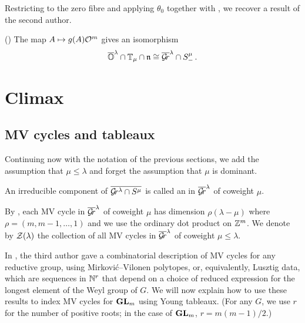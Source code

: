 \documentclass{article}
\begin{document}
Restricting to the zero fibre and applying $\theta_0$ together with , we recover a result of the second author. 
\begin{corollary}\label{cor:mvy} (\cite[Corollary~5.2.2]{dthesis})
    The map $ A \mapsto g(A)\mathcal O^m$ gives an isomorphism 
$$\overline{\mathbb O}^\lambda \cap \mathbb T_\mu\cap\mathfrak n \cong\overline{\mathcal{G}\!r}^\lambda\cap S^\mu_-\,.$$
\end{corollary}
% 
% 
\section{Climax}\label{s:climax}
% 
\subsection{MV cycles and tableaux}\label{ss:mvcs}
% 
% 
Continuing now with the notation of the previous sections, we add the assumption that $\mu\le\lambda$ and forget the assumption that $\mu$ is dominant. 
% 
\begin{definition}
    An irreducible component of $\overline{\mathcal{G}\!r^\lambda \cap S^\mu}$ is called an  in $\overline{\mathcal{G}\!r}^\lambda$ of coweight $\mu$. 
\end{definition}

By \cite[Theorem~3.2(b)]{mirkovic2007geometric}, each MV cycle in $\overline{\mathcal{G}\!r}^\lambda$ of coweight $\mu$ has dimension $ \rho(\lambda - \mu)$ where $ \rho = (m, m-1, \dots, 1)$ and we use the ordinary dot product on $\mathbb Z^m$. We denote by $\mathcal Z(\lambda)$ the collection of all MV cycles in $\overline{\mathcal{G}\!r}^\lambda$ of coweight $\mu\le\lambda$. 

In \cite{kamnitzer2010mirkovic}, the third author gave a combinatorial description of MV cycles for any reductive group, using Mirkovi\'c--Vilonen polytopes, or, equivalently, Lusztig data, which are sequences in $\mathbb N^{r}$ that depend on a choice of reduced expression for the longest element of the Weyl group of $G$.  We will now explain how to use these results to index MV cycles for $ {\mathbf{GL}}_m$ using Young tableaux. (For any $ G$, we use $ r $ for the number of positive roots; in the case of $ {\mathbf{GL}}_m$, $ r = m(m-1)/2$.)
\end{document}
